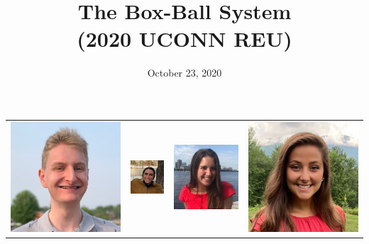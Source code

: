 \documentclass[handout, serif]{beamer}
\title{The Box-Ball System\\(2020 UCONN REU)}
\institute{\vspace{-3em}BIRS Dynamical Algebraic Combinatorics Workshop}
\date{\vspace{-3em}October 23, 2020}
\begin{document}
\begin{frame}
    \maketitle
      \centering
\vspace{-2em}
  \begin{tabular}{c c c c}
    \includegraphics[width=.1\linewidth]{Ben.jpeg} &     \includegraphics[width=.1\linewidth]{Eli.jpeg}  & 
    \includegraphics[width=.1\linewidth]{Rose.jpeg} &
    \includegraphics[width=.1\linewidth]{Aubrey.jpeg}\\
    

\end{tabular}
\end{frame}
\end{document}
